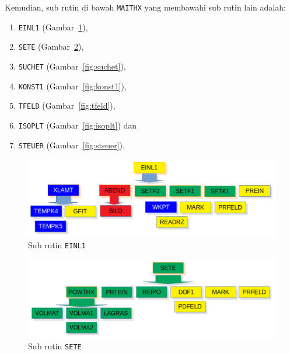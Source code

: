 \documentclass[a4paper,11pt]{report}
\renewcommand{\figurename}{Gambar}
\begin{document}
\vspace*{1cm}
Kemudian, sub rutin di bawah \texttt{MAITHX} yang membawahi sub rutin lain adalah:
\begin{enumerate}
  \item \texttt{EINL1} (\figurename~\ref{fig:einl1}),
  \item \texttt{SETE} (\figurename~\ref{fig:sete}),
  \item \texttt{SUCHET} (\figurename~\ref{fig:suchet}),
  \item \texttt{KONST1} (\figurename~\ref{fig:konst1}),
  \item \texttt{TFELD} (\figurename~\ref{fig:tfeld}),
  \item \texttt{ISOPLT} (\figurename~\ref{fig:isoplt}) dan
  \item \texttt{STEUER} (\figurename~\ref{fig:steuer}).
\end{enumerate}
        
\begin{figure}[h!]
  \begin{center}
    \includegraphics[scale=.5]{../einl1.png}
    \caption{Sub rutin \texttt{EINL1}}
    \label{fig:einl1}
  \end{center}
\end{figure}

\begin{figure}[h!]
  \begin{center}
    \includegraphics[scale=.5]{../sete.png}
    \caption{Sub rutin \texttt{SETE}}
    \label{fig:sete}
  \end{center}
\end{figure}
\end{document}
